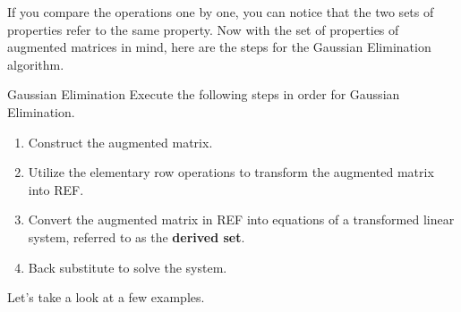 \documentclass[../../../main.tex]{subfiles}
\begin{document}
If you compare the operations one by one, you can notice that the
two sets of properties refer to the same property. Now with the
set of properties of augmented matrices in mind, here are the steps
for the Gaussian Elimination algorithm.

\begin{theorem}{}{Gaussian Elimination}
Execute the following steps in order for Gaussian Elimination.
\begin{enumerate}[noitemsep]
\item
Construct the augmented matrix.
\item
Utilize the elementary row operations to transform the augmented
matrix into REF.
\item
Convert the augmented matrix in REF into equations of a transformed
linear system, referred to as the \textbf{derived set}.
\item
Back substitute to solve the system.
\end{enumerate}
\end{theorem}

Let's take a look at a few examples.
\end{document}
